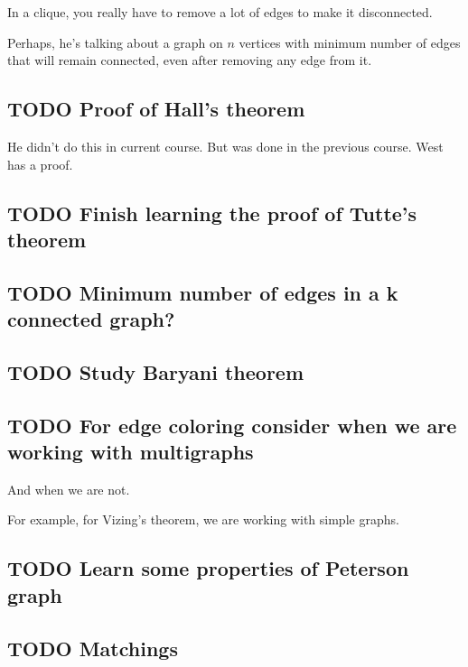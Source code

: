 \documentclass[11pt]{article}
\begin{document}
In a clique, you really have to remove a lot of edges to make it disconnected.

Perhaps, he's talking about a graph on \(n\) vertices with minimum number of
edges that will remain connected, even after removing any edge from it.
\subsection{{\bfseries\sffamily TODO} Proof of Hall's theorem}
\label{sec:org6d6c848}
He didn't do this in current course. But was done in the previous course.
West has a proof.
\subsection{{\bfseries\sffamily TODO} Finish learning the proof of Tutte's theorem}
\label{sec:orgc41ad17}
\subsection{{\bfseries\sffamily TODO} Minimum number of edges in a k connected graph?}
\label{sec:org929bb60}
\subsection{{\bfseries\sffamily TODO} Study Baryani theorem}
\label{sec:org29551bf}
\subsection{{\bfseries\sffamily TODO} For edge coloring consider when we are working with multigraphs}
\label{sec:orgf18d26a}
And when we are not.

For example, for Vizing's theorem, we are working with simple graphs.
\subsection{{\bfseries\sffamily TODO} Learn some properties of Peterson graph}
\label{sec:orgd9c699d}
\subsection{{\bfseries\sffamily TODO} Matchings}
\label{sec:orga32e075}
\end{document}
